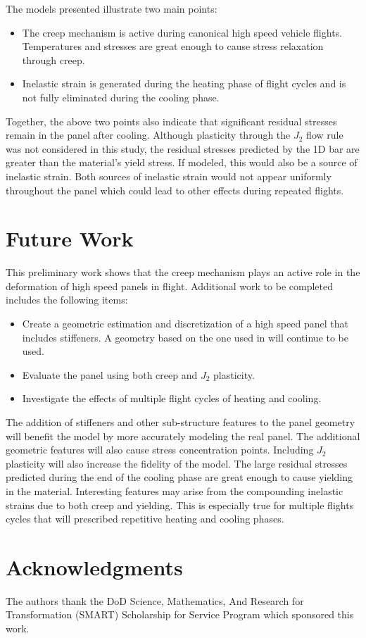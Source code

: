 \documentclass[conf]{new-aiaa}
\begin{document}
The models presented illustrate two main points:
\begin{itemize}
  \item The creep mechanism is active during canonical high speed 
    vehicle flights. Temperatures and stresses are great enough to 
    cause stress relaxation through creep.
  \item Inelastic strain is generated during the heating phase
    of flight cycles and is not fully eliminated during the cooling phase.
\end{itemize}
Together, the above two points also indicate that significant residual 
stresses remain in the panel after cooling. 
Although plasticity through the $J_2$ flow rule was not considered 
in this study, the residual stresses predicted by the 1D bar 
are greater than the material's yield stress. 
If modeled, this would also be a source of inelastic strain.
Both sources of inelastic strain would not appear uniformly
throughout the panel which could lead to other effects 
during repeated flights.

\section{Future Work} \label{sec_future}
This preliminary work shows that the creep mechanism plays 
an active role in the deformation of high speed panels in flight.
Additional work to be completed includes the following items:

\begin{itemize}
  \item Create a geometric estimation and discretization of a high speed panel
        that includes stiffeners.
        A geometry based on the one used in 
        \cite{ culler_impact_of_FTS_coupling_on_response_prediction_hypersonic_skin_panels}
        will continue to be used.
  \item Evaluate the panel using both creep and $J_2$ plasticity.
  \item Investigate the effects of multiple flight cycles of heating and cooling.
\end{itemize}

The addition of stiffeners and other sub-structure features to the panel
geometry will benefit the model by more accurately modeling the real panel.
The additional geometric features will also cause stress concentration points.
Including $J_2$ plasticity will also increase the fidelity of the model. 
The large residual stresses predicted during the end of the cooling phase 
are great enough to cause yielding in the material. 
Interesting features may arise from the compounding inelastic strains
due to both creep and yielding. 
This is especially true for multiple flights cycles that will
prescribed repetitive heating and cooling phases.

\section*{Acknowledgments}
The authors thank the DoD Science, Mathematics, And 
Research for Transformation (SMART) Scholarship
for Service Program which sponsored this work.


\end{document}
